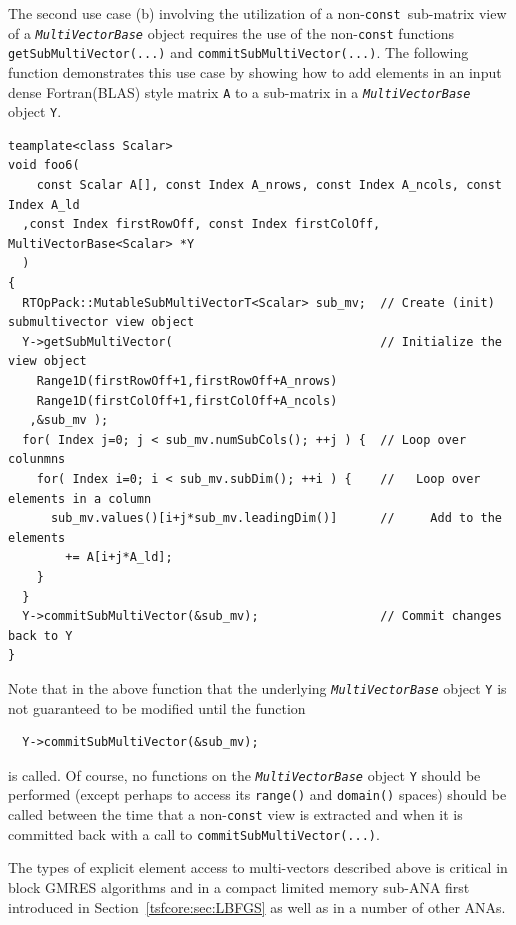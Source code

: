 \documentclass[pdf,ps2pdf,11pt]{SANDreport}
\begin{document}
The second use case (b) involving the utilization of a
non-{}\texttt{const}\ sub-matrix view of a
{}\texttt{\textit{Multi\-Vector\-Base}} object requires the use of the
non-{}\texttt{const} functions {}\texttt{get\-Sub\-Multi\-Vector(...)}
and {}\texttt{commit\-Sub\-Multi\-Vector(...)}.  The following
function demonstrates this use case by showing how to add elements in
an input dense Fortran(BLAS) style matrix {}\texttt{A} to a sub-matrix
in a {}\texttt{\textit{Multi\-Vector\-Base}} object {}\texttt{Y}.

{\scriptsize\begin{verbatim}
teamplate<class Scalar>
void foo6(
	const Scalar A[], const Index A_nrows, const Index A_ncols, const Index A_ld
  ,const Index firstRowOff, const Index firstColOff, MultiVectorBase<Scalar> *Y
  )
{
  RTOpPack::MutableSubMultiVectorT<Scalar> sub_mv;  // Create (init) submultivector view object
  Y->getSubMultiVector(                             // Initialize the view object
    Range1D(firstRowOff+1,firstRowOff+A_nrows)
    Range1D(firstColOff+1,firstColOff+A_ncols)
   ,&sub_mv );
  for( Index j=0; j < sub_mv.numSubCols(); ++j ) {  // Loop over colunmns
    for( Index i=0; i < sub_mv.subDim(); ++i ) {    //   Loop over elements in a column
      sub_mv.values()[i+j*sub_mv.leadingDim()]      //     Add to the elements
        += A[i+j*A_ld];
    }
  }
  Y->commitSubMultiVector(&sub_mv);                 // Commit changes back to Y
}
\end{verbatim}}

Note that in the above function that the underlying
{}\texttt{\textit{Multi\-Vector\-Base}} object {}\texttt{Y} is not
guaranteed to be modified until the function

{\scriptsize\begin{verbatim}
  Y->commitSubMultiVector(&sub_mv);
\end{verbatim}}

{}\noindent{}is called.  Of course, no functions on the
{}\texttt{\textit{Multi\-Vector\-Base}} object {}\texttt{Y} should be
performed (except perhaps to access its {}\texttt{range()} and
{}\texttt{domain()} spaces) should be called between the time that a
non-\texttt{const} view is extracted and when it is committed back
with a call to {}\texttt{commit\-Sub\-Multi\-Vector(...)}.

The types of explicit element access to multi-vectors described above is
critical in block GMRES algorithms and in a compact limited memory sub-ANA
first introduced in Section~\ref{tsfcore:sec:LBFGS} as well as in a number of
other ANAs.
\end{document}
